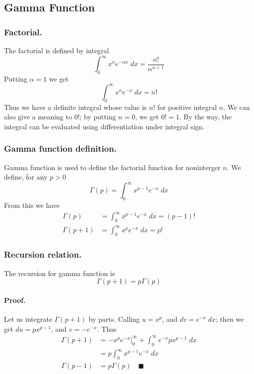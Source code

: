 \documentclass[../../main.tex]{subfiles}
\begin{document}
\subsection*{Gamma Function}
\subsubsection*{Factorial.} The factorial is defined by integral
\begin{equation*}
    \int_{0}^{\infty} x^ne^{-\alpha x}\;dx=\frac{n!}{\alpha^{n+1}}
\end{equation*}
Putting $\alpha=1$ we get 
\begin{equation*}
    \int_{0}^{\infty} x^ne^{-x}\;dx=n!
\end{equation*}
Thus we have a definite integral whose value is $n!$ for positive integral $n$. We can also give a meaning to $0!$; by putting $n=0$, we get $0!=1$. By the way, the integral can be evaluated using differentiation under integral sign. 

\subsubsection*{Gamma function definition.} Gamma function is used to define the factorial function for noninterger $n$. We define, for any $p > 0$
\begin{equation*}
    \Gamma(p)=\int_{0}^{\infty} x^{p-1}e^{-  x}\;dx
\end{equation*}
From this we have 
\begin{align*}
    \Gamma(p)&=\int_{0}^{\infty} x^{p-1}e^{-  x}\;dx=(p-1)!\\
    \Gamma(p+1)&=\int_{0}^{\infty} x^{p}e^{-  x}\;dx=p!
\end{align*}

\subsubsection*{Recursion relation.} The recursion for gamma function is 
\begin{equation*}
    \Gamma(p+1)=p\Gamma(p)
\end{equation*}

\paragraph{Proof.} Let us integrate $\Gamma(p+1)$ by parts. Calling $u=x^p$, and $ dv=e^{-x}\;dx$; then we get $du=px^{p-1}$, and $v=-e^{-x}$. Thus 
\begin{align*}
    \Gamma(p+1)&=-x^pe^{-x}\bigg|_0^{\infty}+\int_{0}^{\infty}e^{-x}px^{p-1}\;dx\\
    &=p\int_{0}^{\infty}x^{p-1}e^{-x}\;dx\\
    \Gamma(p-1)&=p\Gamma(p)\quad\blacksquare
\end{align*}
\end{document}

